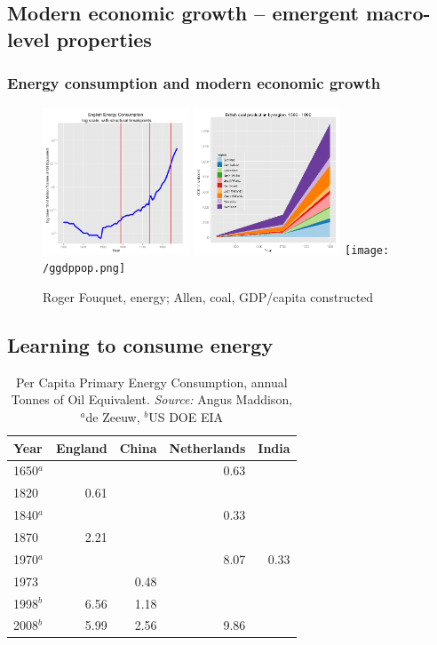 \documentclass[final]{beamer}
\begin{document}
\subsection{Modern economic growth -- emergent macro-level properties}

\begin{frame}
\frametitle{Energy consumption and modern economic growth} 	
 		\begin{figure}
		\centerline{
		\mbox{\includegraphics[width=0.39\textwidth]{gbpmtoelog.png}}
		\mbox{\includegraphics[width=0.39\textwidth]{allen_coal.png}}				
		\mbox{\texttt{[image: /ggdppop.png]}}
		}
		\caption{Roger Fouquet, energy; Allen, coal, GDP/capita constructed}
		\end{figure}
\end{frame}	

\subsection{Learning to consume energy}
\begin{frame}
 	\begin{table}[htb]
	\centering
	

	\begin{tabular}{lrrrr}
	\hline
	Year&England&China&Netherlands&India\\
	\hline \hline
	1650$^a$&&&0.63&  \\
	1820&0.61&&&\\
	1840$^a$ &&&0.33& \\
	1870&2.21&\\
	1970$^a$ &&&8.07&0.33 \\
	1973&&0.48&&\\
	1998$^b$&6.56&1.18\\
	2008$^b$&5.99&2.56&9.86&  \\
	\hline
	\end{tabular}
	\caption{Per Capita Primary Energy Consumption,	annual Tonnes of Oil Equivalent. \textit{Source:} Angus Maddison, $^a$de Zeeuw, $^b$US DOE EIA}
	\label{tab:maddison_energy}

	\end{table}
\end{frame}	
\end{document}
